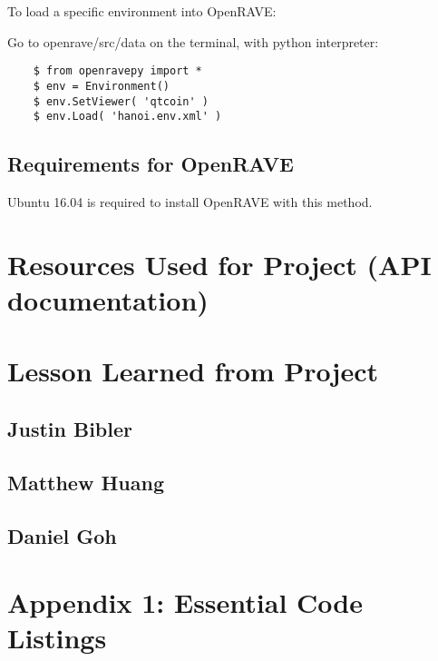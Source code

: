 \documentclass[10pt,journal,compsoc,draftclsnofoot]{IEEEtran}
\begin{document}
\begin{flushleft}
To load a specific environment into OpenRAVE:

Go to openrave/src/data on the terminal, with python interpreter:
\begin{lstlisting}
    $ from openravepy import *
    $ env = Environment()
    $ env.SetViewer( 'qtcoin' )	
    $ env.Load( 'hanoi.env.xml' )
\end{lstlisting}

\subsection{Requirements for OpenRAVE}
Ubuntu 16.04 is required to install OpenRAVE with this method.

\section{Resources Used for Project (API documentation)}



\section{Lesson Learned from Project}

\subsection{Justin Bibler}


\subsection{Matthew Huang}


\subsection{Daniel Goh}



\section{Appendix 1: Essential Code Listings}



\end{flushleft}
\end{document}
